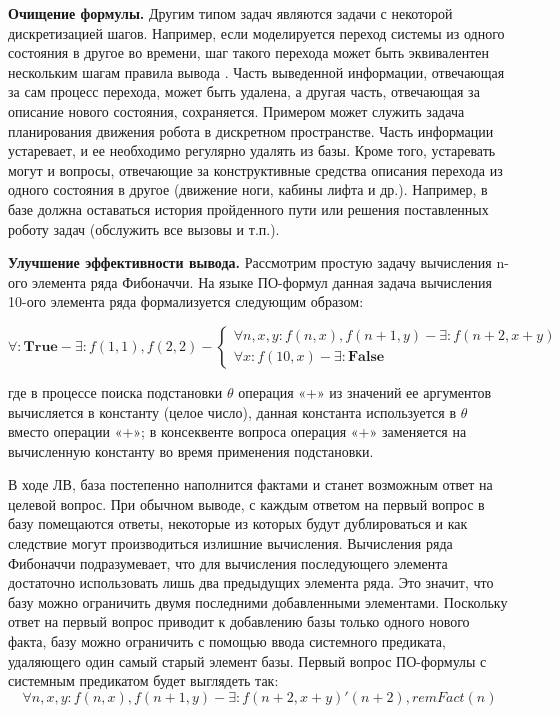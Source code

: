 \textbf{Очищение формулы.} Другим типом задач являются задачи с некоторой дискретизацией шагов. Например, если моделируется переход системы из одного состояния в другое во времени, шаг такого перехода может быть эквивалентен нескольким шагам правила вывода . Часть выведенной информации, отвечающая за сам процесс перехода, может быть удалена, а другая часть, отвечающая за описание нового состояния, сохраняется. Примером может служить задача планирования движения робота в дискретном пространстве. Часть информации устаревает, и ее необходимо регулярно удалять из базы. Кроме того, устаревать могут и вопросы, отвечающие за конструктивные средства описания перехода из одного состояния в другое (движение ноги, кабины лифта и др.). Например, в базе должна оставаться история пройденного пути или решения поставленных роботу задач (обслужить все вызовы и т.п.).

\textbf{Улучшение эффективности вывода.} Рассмотрим простую задачу вычисления n-ого элемента ряда Фибоначчи. На языке ПО-формул данная задача вычисления 10-ого элемента ряда формализуется следующим образом:

\begin{equation}
	\forall\colon\boldsymbol{True} - \exists\colon f(1,1), f(2,2) -
	\left\lbrace
	\begin{array}{l}
		\forall n,x,y\colon f(n,x),f(n+1,y) - \exists\colon f(n+2,x+y) \\
		\forall x\colon f(10,x) - \exists\colon \boldsymbol{False}
	\end{array}\right.
\end{equation}

где в процессе поиска подстановки $\theta$ операция «+» из значений ее аргументов вычисляется в константу (целое число), данная константа используется в $\theta$ вместо операции «+»; в консеквенте вопроса операция «+» заменяется на вычисленную константу во время применения подстановки.

В ходе ЛВ, база постепенно наполнится фактами и станет возможным ответ на целевой вопрос. При обычном выводе, с каждым ответом на первый вопрос в базу помещаются ответы, некоторые из которых будут дублироваться и как следствие могут производиться излишние вычисления. Вычисления ряда Фибоначчи подразумевает, что для вычисления последующего элемента достаточно использовать лишь два предыдущих элемента ряда. Это значит, что базу можно ограничить двумя последними добавленными элементами. Поскольку ответ на первый вопрос приводит к добавлению базы только одного нового факта, базу можно ограничить с помощью ввода системного предиката, удаляющего один самый старый элемент базы. Первый вопрос ПО-формулы с системным предикатом будет выглядеть так:
\begin{equation}
	\forall n,x,y\colon f(n,x),f(n+1,y) - \exists\colon f(n+2,x+y)'(n+2), remFact(n)
\end{equation}

